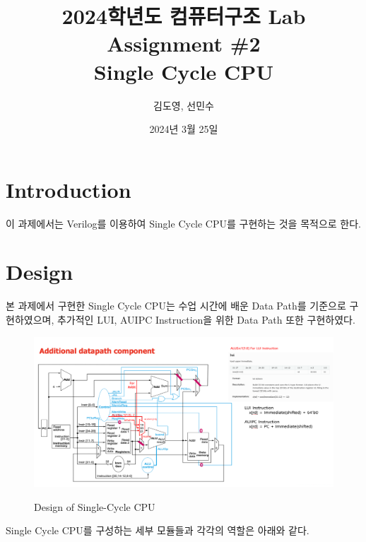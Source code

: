 \documentclass[openright, a4paper]{article}
\title{2024학년도 컴퓨터구조 Lab Assignment \#2\\
        Single Cycle CPU}
\author{김도영, 선민수}
\date{2024년 3월 25일}
\begin{document}
\maketitle

\section{Introduction}
이 과제에서는 Verilog를 이용하여 Single Cycle CPU를 구현하는 것을 목적으로 한다.


\section{Design}
본 과제에서 구현한 Single Cycle CPU는 수업 시간에 배운 Data Path를 기준으로 구현하였으며, 추가적인 LUI, AUIPC Instruction을 위한 Data Path 또한 구현하였다.

{
    \begin{figure}[!h]
        \centering
        \includegraphics[width=\textwidth]{Design.png}
        \label{fig:design}
        \caption{Design of Single-Cycle CPU}
    \end{figure}
}

Single Cycle CPU를 구성하는 세부 모듈들과 각각의 역할은 아래와 같다.

\hfill
\end{document}
